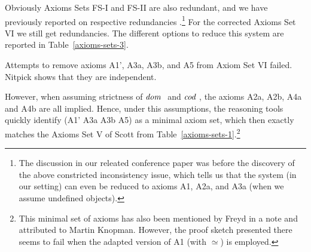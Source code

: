 Obviously Axioms Sets FS-I and FS-II are also redundant, and we have previously reported 
on respective redundancies \cite{ICMS}.\footnote{The discussion in our releated
  conference paper \cite{ICMS} was before the discovery of the above 
constricted inconsistency issue, which tells us that the system (in our setting) can even be reduced 
to axioms A1, A2a, and A3a (when we assume undefined objects).} For
the corrected Axioms Set VI we still get redundancies. The different options to reduce this system are reported in
Table~\ref{axioms-sets-3}.

Attempts to remove axioms A1', A3a, A3b, and A5 from Axiom Set VI failed. Nitpick shows that they are independent. 

However, when assuming strictness of $\textit{dom \/}$ and $\textit{cod \/}$, the axioms
A2a, A2b, A4a and A4b are all implied. Hence, under this 
   assumptions, the reasoning tools quickly identify (A1' A3a A3b A5) as a minimal axiom 
   set, which then exactly matches the Axioms Set V of Scott from Table~\ref{axioms-sets-1}.\footnote{This minimal set of axioms 
   has also been mentioned by Freyd in a note \cite{Freyd16} and attributed to Martin Knopman. However, the proof
   sketch presented there seems to fail when the adapted version of A1 (with $\simeq$) is employed.}



